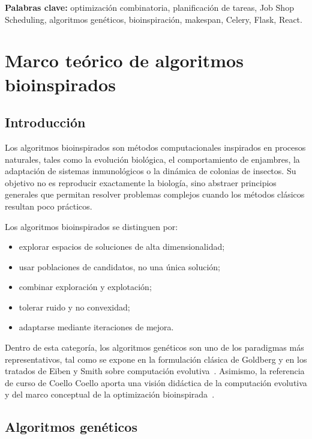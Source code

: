 \documentclass[11pt,a4paper]{article}
\begin{document}
\noindent\textbf{Palabras clave:} optimización combinatoria, planificación de tareas, Job Shop Scheduling, algoritmos genéticos, bioinspiración, makespan, Celery, Flask, React.

\section{Marco teórico de algoritmos bioinspirados}

\subsection{Introducción}

Los algoritmos bioinspirados son métodos computacionales inspirados en procesos naturales, tales como la evolución biológica, el comportamiento de enjambres, la adaptación de sistemas inmunológicos o la dinámica de colonias de insectos. Su objetivo no es reproducir exactamente la biología, sino abstraer principios generales que permitan resolver problemas complejos cuando los métodos clásicos resultan poco prácticos.

Los algoritmos bioinspirados se distinguen por:

\begin{itemize}
    \item explorar espacios de soluciones de alta dimensionalidad;
    \item usar poblaciones de candidatos, no una única solución;
    \item combinar exploración y explotación;
    \item tolerar ruido y no convexidad;
    \item adaptarse mediante iteraciones de mejora.
\end{itemize}

Dentro de esta categoría, los algoritmos genéticos son uno de los paradigmas más representativos, tal como se expone en la formulación clásica de Goldberg y en los tratados de Eiben y Smith sobre computación evolutiva~\cite{goldberg1989genetic,eiben2015introduction}. Asimismo, la referencia de curso de Coello Coello aporta una visión didáctica de la computación evolutiva y del marco conceptual de la optimización bioinspirada~\cite{coello2026introduccion}.

\subsection{Algoritmos genéticos}
\end{document}
